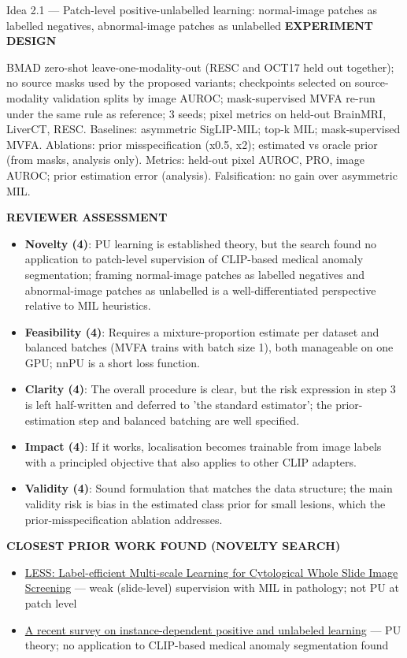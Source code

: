 \documentclass[11pt,a4paper]{article}
\newcommand{\lbl}[1]{{\sffamily\footnotesize\bfseries\color{muted}\MakeUppercase{#1}}\par}
\begin{document}
\begin{ideabox}{Idea 2.1 — Patch-level positive-unlabelled learning: normal-image patches as labelled negatives, abnormal-image patches as unlabelled}
\lbl{Experiment design}BMAD zero-shot leave-one-modality-out (RESC and OCT17 held out together); no source masks used by the proposed variants; checkpoints selected on source-modality validation splits by image AUROC; mask-supervised MVFA re-run under the same rule as reference; 3 seeds; pixel metrics on held-out BrainMRI, LiverCT, RESC. Baselines: asymmetric SigLIP-MIL; top-k MIL; mask-supervised MVFA. Ablations: prior misspecification (x0.5, x2); estimated vs oracle prior (from masks, analysis only). Metrics: held-out pixel AUROC, PRO, image AUROC; prior estimation error (analysis). Falsification: no gain over asymmetric MIL.

\lbl{Reviewer assessment}\begin{itemize}[leftmargin=1.2em,itemsep=1pt,topsep=2pt]
\item \textbf{Novelty (4)}: PU learning is established theory, but the search found no application to patch-level supervision of CLIP-based medical anomaly segmentation; framing normal-image patches as labelled negatives and abnormal-image patches as unlabelled is a well-differentiated perspective relative to MIL heuristics.
\item \textbf{Feasibility (4)}: Requires a mixture-proportion estimate per dataset and balanced batches (MVFA trains with batch size 1), both manageable on one GPU; nnPU is a short loss function.
\item \textbf{Clarity (4)}: The overall procedure is clear, but the risk expression in step 3 is left half-written and deferred to 'the standard estimator'; the prior-estimation step and balanced batching are well specified.
\item \textbf{Impact (4)}: If it works, localisation becomes trainable from image labels with a principled objective that also applies to other CLIP adapters.
\item \textbf{Validity (4)}: Sound formulation that matches the data structure; the main validity risk is bias in the estimated class prior for small lesions, which the prior-misspecification ablation addresses.
\end{itemize}
\lbl{Closest prior work found (novelty search)}\begin{itemize}[leftmargin=1.2em,itemsep=1pt,topsep=2pt]
\item \href{https://arxiv.org/pdf/2306.03407}{LESS: Label-efficient Multi-scale Learning for Cytological Whole Slide Image Screening} — weak (slide-level) supervision with MIL in pathology; not PU at patch level
\item \href{https://www.ncbi.nlm.nih.gov/pmc/articles/PMC11997483/}{A recent survey on instance-dependent positive and unlabeled learning} — PU theory; no application to CLIP-based medical anomaly segmentation found

\end{itemize}
\end{ideabox}
\end{document}
